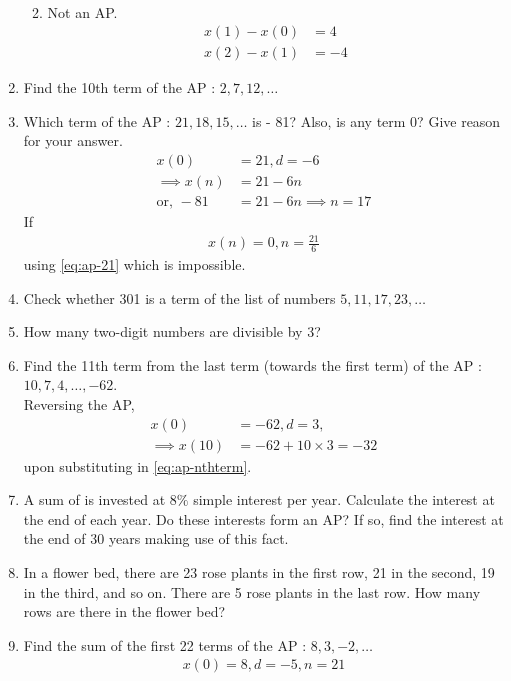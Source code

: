 \begin{enumerate}[label=\thesubsection.\arabic*, ref=\thesubsection.\theenumi]
\begin{enumerate}
\begin{align}
\end{align}
	\item 
		Not an AP.
\begin{align}
	x(1)-x(0)&=4
	\\
	x(2)-x(1)&=-4
\end{align}
\end{enumerate}
\item Find the 10th term of the AP : $2,  7,  12,  \dots$
\item Which term of the AP : $21,  18,  15,  \dots$ is - 81? Also,  is any term 0? Give reason for your answer.
	\\
	\solution
\begin{align}
	x(0) &= 21, d = -6
	\\
	\implies x(n) &= 21 -6n
	\label{eq:ap-21}
	\\
	\text{or, }-81 &=21-6n \implies n = 17
\end{align}
If
\begin{align}
	x(n) = 0, 
 n= \frac{21}{6}
\end{align}
	using \eqref{eq:ap-21} which is impossible.
\item Check whether 301 is a term of the list of numbers $5,  11,  17,  23,  \dots$
\item How many two-digit numbers are divisible by 3?
\item Find the 11th term from the last term (towards the first term) of the
AP : $10,  7,  4,  \dots,  - 62$.
	\\
	\solution Reversing the AP,
\begin{align}
	x(0) &= -62, d = 3, 
	\\
	\implies x(10)&=-62+10\times 3 = -32
\end{align}
upon substituting in
	\eqref{eq:ap-nthterm}.
\item A sum of  is invested at $8\%$ simple interest per year. Calculate the interest at the end of each year. Do these interests form an AP? If so,  find the interest at the end of 30 years making use of this fact.
\item In a flower bed,  there are 23 rose plants in the first row,  21 in the
second,  19 in the third,  and so on. There are 5 rose plants in the last row. How many rows are there in the flower bed?
\item Find the sum of the first 22 terms of the AP : $8,  3,  -2,  \dots$
	\\
	\solution
\begin{align}
x(0) = 8, d = -5, n = 21
\\

\end{align}
\end{enumerate}
